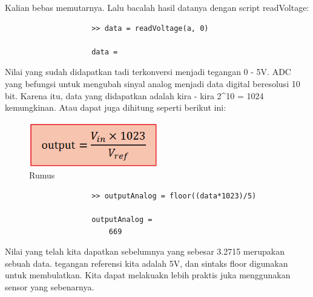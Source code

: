 \begin{enumerate}
				Kalian bebas memutarnya. Lalu bacalah hasil datanya dengan script readVoltage:
				
				\begin{verbatim}
					>> data = readVoltage(a, 0)
 
					data =
				\end{verbatim}
				Nilai yang sudah didapatkan tadi terkonversi menjadi tegangan 0 - 5V. ADC yang befungsi untuk mengubah sinyal analog menjadi data digital beresolusi 10 bit. Karena itu, data yang didapatkan adalah kira - kira 2^10 = 1024 kemungkinan. Atau dapat juga dihitung seperti berikut ini:
				
				\begin{figure}[ht]
					\centerline{\includegraphics[width=0.5\textwidth]{figures/rumus.png}}
					\caption{Rumus}
					\label{rumus}
				\end{figure}
				
				\begin{verbatim}
					>> outputAnalog = floor((data*1023)/5)
 
					outputAnalog =
						669
				\end{verbatim}
				
				Nilai yang telah kita dapatkan sebelumnya yang sebesar 3.2715 merupakan sebuah data. tegangan referensi kita adalah 5V, dan sintaks floor digunakan untuk membulatkan. Kita dapat melakuakn lebih praktis juka menggunakan sensor yang sebenarnya.
		\end{enumerate}
		
\cite{steiner2009firmata}